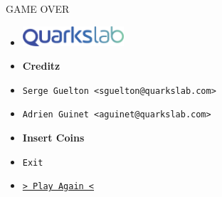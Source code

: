 \documentclass[14pt]{beamer}
\begin{document}
    \begin{frame}{GAME OVER}

        \begin{itemize}
            \centering
            \item[]\includegraphics[height=2em]{logo.png}
            \item[]\alert{\bf Creditz}\vspace{-1em}
            \item[]\texttt{Serge~Guelton~<sguelton@quarkslab.com>}
            \item[]\texttt{Adrien Guinet <aguinet@quarkslab.com>}
        \end{itemize}
        \begin{itemize}
            \centering
            \item[]\alert{\bf Insert Coins}\vspace{.1em}
            \item[]\texttt{Exit}
            \item[]\texttt{\hyperlink{Frame1}{> Play Again <}}
        \end{itemize}

    \end{frame}
\end{document}
